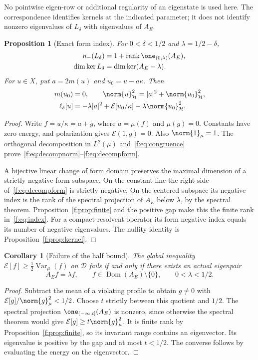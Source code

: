 \documentclass[11pt,a4paper]{article}
\numberwithin{equation}{section}
\newtheorem{proposition}[theorem]{Proposition}
\newtheorem{corollary}[theorem]{Corollary}
\theoremstyle{definition}\newtheorem{definition}[theorem]{Definition}
\theoremstyle{remark}\newtheorem{remark}[theorem]{Remark}
\newcommand{\E}{\mathcal E}\newcommand{\D}{\mathcal D}
\newcommand{\Hh}{\mathcal H}\newcommand{\Hw}{\mathcal H}
\newcommand{\dom}{\operatorname{Dom}}\newcommand{\Var}{\operatorname{Var}}
\newcommand{\rank}{\operatorname{rank}}\newcommand{\ess}{\operatorname{ess}}\newcommand{\supp}{\operatorname{supp}}
\begin{document}
No pointwise eigen-row or additional regularity of an eigenstate is used here. The correspondence identifies kernels at the indicated parameter; it does not identify nonzero eigenvalues of $L_\delta$ with eigenvalues of $A_E$.

\begin{proposition}[Exact form index]\label{f:prop:index}
For $0<\delta<1/2$ and $\lambda=1/2-\delta$,
\begin{align}
 n_-(L_\delta)&=1+\rank\one_{(0,\lambda)}(A_E),\label{f:eq:index}\\
 \dim\ker L_\delta&=\dim\ker(A_E-\lambda).\label{f:eq:nullity}
\end{align}
For $u\in X$, put $a=2m(u)$ and $u_0=u-a\kappa$. Then
\begin{align}
 m(u_0)&=0,\qquad
 \norm{u}_{\Hh}^2=|a|^2+\norm{u_0}_{\Hh}^2,\label{f:eq:decompnorm}\\
 \ell_\delta[u]&=-\lambda|a|^2+
              \E[u_0/\kappa]-\lambda\norm{u_0}_{\Hh}^2.\label{f:eq:decompform}
\end{align}
\end{proposition}
\begin{proof}
Write $f=u/\kappa=a+g$, where $a=\mu(f)$ and $\mu(g)=0$. Constants have zero energy, and polarization gives $\E(1,g)=0$. Also $\norm{1}_\mu=1$. The orthogonal decomposition in $L^2(\mu)$ and~\eqref{f:eq:congruence} prove~\eqref{f:eq:decompnorm}--\eqref{f:eq:decompform}.

A bijective linear change of form domain preserves the maximal dimension of a strictly negative form subspace. On the constant line the right side of~\eqref{f:eq:decompform} is strictly negative. On the centered subspace its negative index is the rank of the spectral projection of $A_E$ below $\lambda$, by the spectral theorem. Proposition~\ref{f:prop:finite} and the positive gap make this the finite rank in~\eqref{f:eq:index}. For a compact-resolvent operator its form negative index equals its number of negative eigenvalues. The nullity identity is Proposition~\ref{f:prop:kernel}.
\end{proof}

\begin{corollary}[Failure of the half bound]\label{f:cor:failure}
The global inequality $\E[f]\ge\tfrac12\Var_\mu(f)$ on $\D$ fails if and only if there exists an actual eigenpair
\[
 A_Ef=\lambda f,\qquad f\in\dom(A_E)\setminus\{0\},\qquad0<\lambda<1/2.
\]
\end{corollary}
\begin{proof}
Subtract the mean of a violating profile to obtain $g\ne0$ with $\E[g]/\norm{g}_\mu^2<1/2$. Choose $t$ strictly between this quotient and $1/2$. The spectral projection $\one_{(-\infty,t]}(A_E)$ is nonzero, since otherwise the spectral theorem would give $\E[g]\ge t\norm{g}_\mu^2$. It is finite rank by Proposition~\ref{f:prop:finite}, so its invariant range contains an eigenvector. Its eigenvalue is positive by the gap and at most $t<1/2$. The converse follows by evaluating the energy on the eigenvector.
\end{proof}
\end{document}
